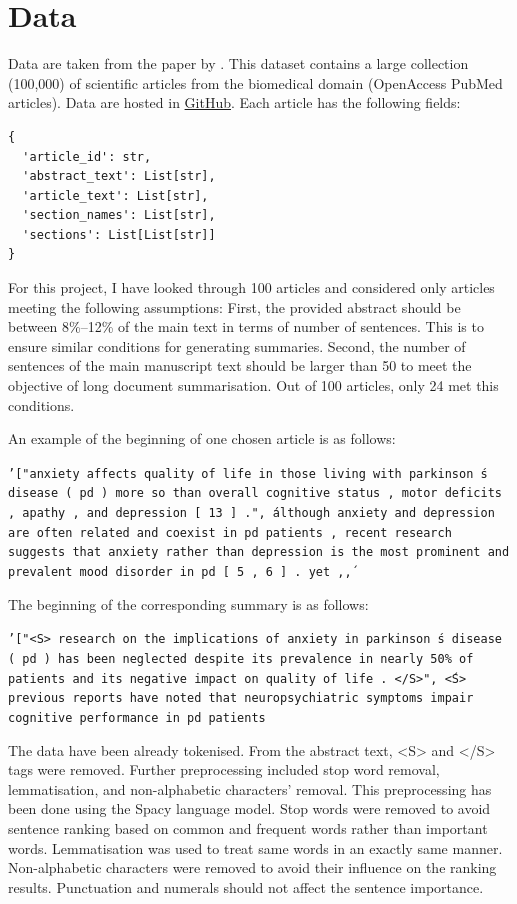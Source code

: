 \documentclass[11pt]{article}
\begin{document}
\section{Data}

Data are taken from the paper by \citet{cohan2018discourse}. This dataset contains a large collection (100,000) of scientific articles from the biomedical domain (OpenAccess PubMed articles). Data are hosted in \href{https://github.com/armancohan/long-summarization}{GitHub}. Each article has the following fields: 
\begin{verbatim}
{ 
  'article_id': str,
  'abstract_text': List[str],
  'article_text': List[str],
  'section_names': List[str],
  'sections': List[List[str]]
}
\end{verbatim}

For this project, I have looked through 100 articles and considered only articles meeting the following assumptions: First, the provided abstract should be between 8\%--12\% of the main text in terms of number of sentences. This is to ensure similar conditions for generating summaries. Second, the number of sentences of the main manuscript text should be larger than 50 to meet the objective of long document summarisation. Out of 100 articles, only 24 met this conditions.

An example of the beginning of one chosen article is as follows:

\texttt{'["anxiety affects quality of life in those living with parkinson \'s disease ( pd ) more so than overall cognitive status , motor deficits , apathy , and depression [ 13 ] .", \'although anxiety and depression are often related and coexist in pd patients , recent research suggests that anxiety rather than depression is the most prominent and prevalent mood disorder in pd [ 5 , 6 ] . yet ,\', }

The beginning of the corresponding summary is as follows:

\texttt{'["<S> research on the implications of anxiety in parkinson \'s disease ( pd ) has been neglected despite its prevalence in nearly 50\% of patients and its negative impact on quality of life . </S>", \'<S> previous reports have noted that neuropsychiatric symptoms impair cognitive performance in pd patients }

The data have been already tokenised. From the abstract text, <S> and </S> tags were removed. Further preprocessing included stop word removal, lemmatisation, and non-alphabetic characters' removal. This preprocessing has been done using the Spacy language model. Stop words were removed to avoid sentence ranking based on common and frequent words rather than important words. Lemmatisation was used to treat same words in an exactly same manner. Non-alphabetic characters were removed to avoid their influence on the ranking results. Punctuation and numerals should not affect the sentence importance.
 
\end{document}
